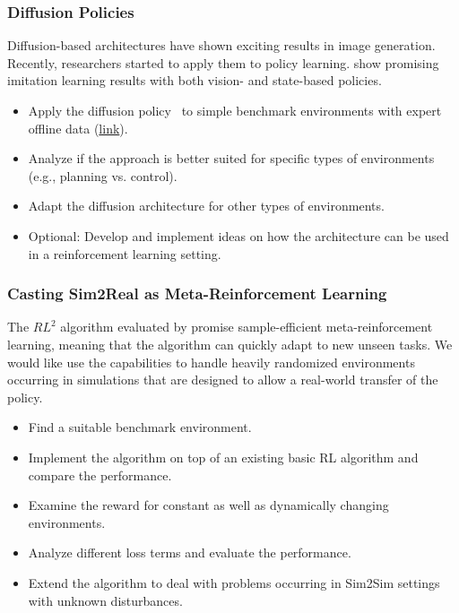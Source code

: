 \documentclass[a4paper]{article}
\begin{document}
\subsubsection{Diffusion Policies}
Diffusion-based architectures have shown exciting results in image generation.
Recently, researchers started to apply them to policy learning. 
\citet{Chi2023DiffusionPolicy} show promising imitation learning results with both vision- and state-based policies.
\begin{itemize}
  \item Apply the diffusion policy~\cite{Chi2023DiffusionPolicy} to simple benchmark environments with expert offline data (\href{https://github.com/Farama-Foundation/d4rl/wiki/Tasks}{link}).
  \item Analyze if the approach is better suited for specific types of environments (e.g., planning vs. control).
  \item Adapt the diffusion architecture for other types of environments.
  \item Optional: Develop and implement ideas on how the architecture can be used in a reinforcement learning setting. 
\end{itemize}



\subsubsection{Casting Sim2Real as Meta-Reinforcement Learning}
The $RL^2$ algorithm evaluated by \citet{Yu2017} promise sample-efficient meta-reinforcement learning, meaning that the algorithm can quickly adapt to new unseen tasks. We would like use the capabilities to handle heavily randomized environments occurring in simulations that are designed to allow a real-world transfer of the policy.
\begin{itemize}
  \item Find a suitable benchmark environment.
  \item Implement the algorithm on top of an existing basic RL algorithm and compare the performance.
  \item Examine the reward for constant as well as dynamically changing environments.
  \item Analyze different loss terms and evaluate the performance.
  \item Extend the algorithm to deal with problems occurring in Sim2Sim settings with unknown disturbances.
\end{itemize}
\end{document}
